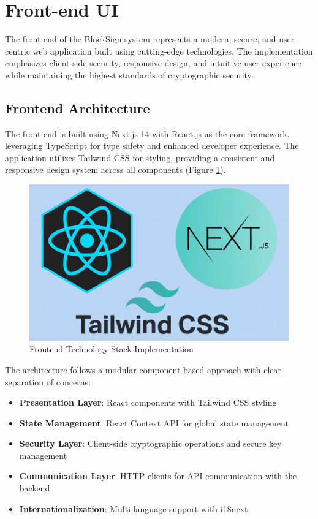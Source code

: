 \section{Front-end UI}
The front-end of the BlockSign system represents a modern, secure, and user-centric web application built using cutting-edge technologies. The implementation emphasizes client-side security, responsive design, and intuitive user experience while maintaining the highest standards of cryptographic security.

\subsection{Frontend Architecture}
The front-end is built using Next.js 14 with React.js as the core framework, leveraging TypeScript for type safety and enhanced developer experience. The application utilizes Tailwind CSS for styling, providing a consistent and responsive design system across all components (Figure \ref{frontend-stack}).

\begin{figure}[H]
    \centering
    \includegraphics[width=18cm]{"images/siteUI/frontStack.png"}
    \caption{Frontend Technology Stack Implementation}
    \label{frontend-stack}
\end{figure}

The architecture follows a modular component-based approach with clear separation of concerns:

\begin{itemize}
    \item \textbf{Presentation Layer}: React components with Tailwind CSS styling
    \item \textbf{State Management}: React Context API for global state management
    \item \textbf{Security Layer}: Client-side cryptographic operations and secure key management
    \item \textbf{Communication Layer}: HTTP clients for API communication with the backend
    \item \textbf{Internationalization}: Multi-language support with i18next
\end{itemize}

